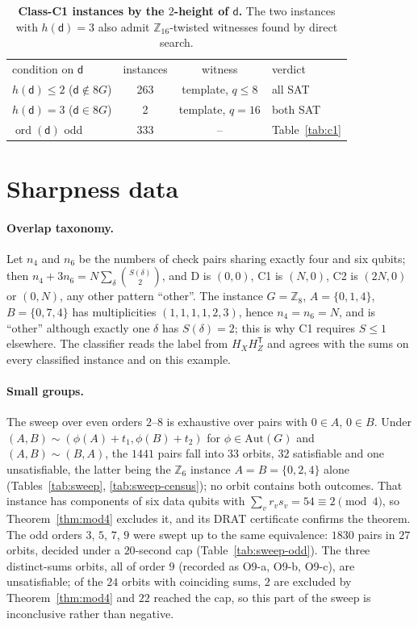 \documentclass[reprint,twocolumn,superscriptaddress,nofootinbib]{revtex4-2}
\theoremstyle{plain}
\newcommand{\col}{\mathsf{d}}          %
\begin{document}
\begin{table}[!htbp]
\caption{\textbf{Class-C1 instances by the $2$-height of $\col$.} The two
instances with $h(\col)=3$ also admit $\mathbb{Z}_{16}$-twisted witnesses
found by direct search.}
\label{tab:twoheight}
\begin{ruledtabular}
\begin{tabular}{lccl}
condition on $\col$ & instances & witness & verdict \\
\colrule
$h(\col)\le2$ ($\col\notin8G$) & 263 & template, $q\le8$ & all SAT \\
$h(\col)=3$ ($\col\in8G$) & 2 & template, $q=16$ & both SAT \\
$\operatorname{ord}(\col)$ odd & 333 & -- & Table~\ref{tab:c1} \\
\end{tabular}
\end{ruledtabular}
\end{table}

\section{Sharpness data}
\label{si:sharpness}

\paragraph*{Overlap taxonomy.}
Let $n_4$ and $n_6$ be the numbers of check pairs sharing exactly four and
six qubits; then $n_4+3n_6=N\sum_\delta\binom{S(\delta)}{2}$, and D is
$(0,0)$, C1 is $(N,0)$, C2 is $(2N,0)$ or $(0,N)$, any other pattern
``other''. The instance $G=\mathbb{Z}_8$, $A=\{0,1,4\}$, $B=\{0,7,4\}$ has
multiplicities $(1,1,1,1,2,3)$, hence $n_4=n_6=N$, and is ``other''
although exactly one $\delta$ has $S(\delta)=2$; this is why C1 requires
$S\le1$ elsewhere. The classifier reads the label from $H_XH_Z^{\mathsf T}$
and agrees with the sums on every classified instance and on this example.

\paragraph*{Small groups.}
The sweep over even orders $2$--$8$ is exhaustive over pairs with $0\in A$,
$0\in B$. Under $(A,B)\sim(\phi(A)+t_1,\phi(B)+t_2)$ for
$\phi\in\mathrm{Aut}(G)$ and $(A,B)\sim(B,A)$, the $1441$ pairs fall into
$33$ orbits, $32$ satisfiable and one unsatisfiable, the latter being the
$\mathbb{Z}_6$ instance $A=B=\{0,2,4\}$ alone (Tables~\ref{tab:sweep},
\ref{tab:sweep-census}); no orbit contains both outcomes. That instance has
components of six data qubits with $\sum_vr_vs_v=54\equiv2\pmod4$, so
Theorem~\ref{thm:mod4} excludes it, and its DRAT certificate confirms the
theorem. The odd orders $3$, $5$, $7$, $9$ were swept up to the same
equivalence: $1830$ pairs in $27$ orbits, decided under a $20$-second cap
(Table~\ref{tab:sweep-odd}). The three distinct-sums orbits, all of order
$9$ (recorded as O9-a, O9-b, O9-c), are unsatisfiable; of the $24$ orbits
with coinciding sums, $2$ are excluded by Theorem~\ref{thm:mod4} and $22$
reached the cap, so this part of the sweep is inconclusive rather than
negative.
\end{document}
